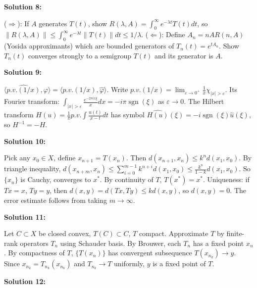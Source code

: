 \documentclass[12pt,a4paper]{exam}
\begin{document}
\vspace{0.5cm}

\textbf{Solution 8:}

($\Rightarrow$): If $A$ generates $T(t)$, show $R(\lambda,A) = \int_0^\infty e^{-\lambda t} T(t) dt$, so $\|R(\lambda,A)\| \leq \int_0^\infty e^{-\lambda t} \|T(t)\| dt \leq 1/\lambda$. ($\Leftarrow$): Define $A_n = nAR(n,A)$ (Yosida approximants) which are bounded generators of $T_n(t) = e^{t A_n}$. Show $T_n(t)$ converges strongly to a semigroup $T(t)$ and its generator is $A$.

\vspace{0.5cm}

\textbf{Solution 9:}

$\langle \widehat{p.v.(1/x)}, \varphi \rangle = \langle p.v.(1/x), \widehat{\varphi} \rangle$. Write $p.v.(1/x) = \lim_{\varepsilon \to 0^+} \frac{1}{x} \chi_{|x|>\varepsilon}$. Its Fourier transform: $\int_{|x|>\varepsilon} \frac{e^{-2\pi i x \xi}}{x} dx = -i\pi \operatorname{sgn}(\xi)$ as $\varepsilon \to 0$. The Hilbert transform $H(u) = \frac{1}{\pi} p.v. \int \frac{u(t)}{x-t} dt$ has symbol $\widehat{H(u)}(\xi) = -i \operatorname{sgn}(\xi) \widehat{u}(\xi)$, so $H^{-1} = -H$.

\vspace{0.5cm}

\textbf{Solution 10:}

Pick any $x_0 \in X$, define $x_{n+1} = T(x_n)$. Then $d(x_{n+1}, x_n) \leq k^n d(x_1, x_0)$. By triangle inequality, $d(x_{n+m}, x_n) \leq \sum_{i=0}^{m-1} k^{n+i} d(x_1, x_0) \leq \frac{k^n}{1-k} d(x_1, x_0)$. So $\{x_n\}$ is Cauchy, converges to $x^*$. By continuity of $T$, $T(x^*) = x^*$. Uniqueness: if $Tx=x$, $Ty=y$, then $d(x,y) = d(Tx,Ty) \leq k d(x,y)$, so $d(x,y)=0$. The error estimate follows from taking $m \to \infty$.

\vspace{0.5cm}

\textbf{Solution 11:}

Let $C \subset X$ be closed convex, $T(C) \subset C$, $T$ compact. Approximate $T$ by finite-rank operators $T_n$ using Schauder basis. By Brouwer, each $T_n$ has a fixed point $x_n$. By compactness of $T$, $\{T(x_n)\}$ has convergent subsequence $T(x_{n_k}) \to y$. Since $x_{n_k} = T_{n_k}(x_{n_k})$ and $T_{n_k} \to T$ uniformly, $y$ is a fixed point of $T$.

\vspace{0.5cm}

\textbf{Solution 12:}
\end{document}
